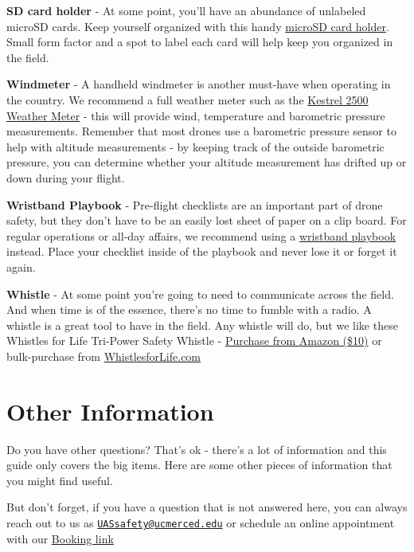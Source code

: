 \documentclass[
  12pt,
]{book}
\begin{document}
\textbf{SD card holder} - At some point, you'll have an abundance of unlabeled microSD cards. Keep yourself organized with this handy \href{https://www.amazon.com/Holder-Storage-Organizer-Lightweight-Portable/dp/B07T6SWXK5/}{microSD card holder}. Small form factor and a spot to label each card will help keep you organized in the field.

\textbf{Windmeter} - A handheld windmeter is another must-have when operating in the country. We recommend a full weather meter such as the \href{https://kestrelmeters.com/collections/all-kestrel-meters/products/kestrel-2500-weather-meter}{Kestrel 2500 Weather Meter} - this will provide wind, temperature and barometric pressure measurements. Remember that most drones use a barometric pressure sensor to help with altitude measurements - by keeping track of the outside barometric pressure, you can determine whether your altitude measurement has drifted up or down during your flight.

\textbf{Wristband Playbook} - Pre-flight checklists are an important part of drone safety, but they don't have to be an easily lost sheet of paper on a clip board. For regular operations or all-day affairs, we recommend using a \href{https://www.amazon.com/dp/B01DJJW8QW}{wristband playbook} instead. Place your checklist inside of the playbook and never lose it or forget it again.

\textbf{Whistle} - At some point you're going to need to communicate across the field. And when time is of the essence, there's no time to fumble with a radio. A whistle is a great tool to have in the field. Any whistle will do, but we like these Whistles for Life Tri-Power Safety Whistle - \href{https://www.amazon.com/Whistles-Life-Tri-Power-Whistle-Snorkelers/dp/B004RRZIUO/}{Purchase from Amazon (\$10)} or bulk-purchase from \href{https://whistlesforlife.com/}{WhistlesforLife.com}

\hypertarget{other-information}{%
\chapter{Other Information}\label{other-information}}

Do you have other questions? That's ok - there's a lot of information and this guide only covers the big items. Here are some other pieces of information that you might find useful.

But don't forget, if you have a question that is not answered here, you can always reach out to us as \href{mailto:UASsafety@ucmerced.edu}{\nolinkurl{UASsafety@ucmerced.edu}} or schedule an online appointment with our \href{https://outlook.office365.com/owa/calendar/UCCenterofExcellenceonUASSafety@merced.onmicrosoft.com/bookings/}{Booking link}
\end{document}
